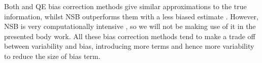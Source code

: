 Both  and \ac{QE} bias correction methods give similar approximations to the true information, whilst \ac{NSB} outperforms them with a less biased estimate \cite{Panzeri2007}.
However, \ac{NSB} is very computationally intensive \cite{Panzeri2007}, so we will not be making use of it in the presented body work.
All these bias correction methods tend to make a trade off between variability and bias, introducing more terms and hence more variability to reduce the size of bias term.






